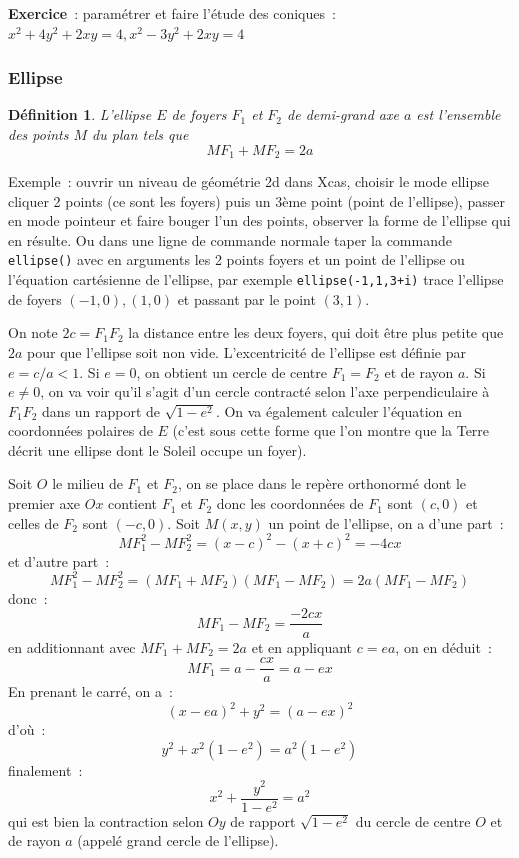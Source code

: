 \documentclass[a4paper,11pt]{article}
\newtheorem{defn}[thm]{D\'efinition}
\begin{document}
{\bf Exercice}~: param\'etrer et faire l'\'etude des coniques~:\\
$x^2+4y^2+2xy=4, x^2-3y^2+2xy=4$

\subsubsection{Ellipse}
\begin{defn}
L'ellipse $E$ de foyers $F_1$ et $F_2$ de demi-grand axe
$a$ est l'ensemble des points $M$ du plan tels que 
\[ MF_1+MF_2=2a\]
\end{defn}
Exemple~: ouvrir un niveau de g\'eom\'etrie 2d dans Xcas,
choisir le mode ellipse cliquer 2 points (ce sont les foyers)
puis un 3\`eme point (point de l'ellipse), passer en mode
pointeur et faire bouger l'un des points, observer la forme
de l'ellipse qui en r\'esulte. Ou dans une ligne de commande
normale taper la commande \verb|ellipse()| avec
en arguments les 2 points foyers et un point de l'ellipse
ou l'\'equation cart\'esienne de l'ellipse, par exemple
\verb|ellipse(-1,1,3+i)| trace l'ellipse de foyers $(-1,0), (1,0)$
et passant par le point $(3,1)$.

On note $2c=F_1F_2$ la distance entre les deux foyers, qui doit \^etre
plus petite que $2a$ pour que l'ellipse soit non vide.
L'excentricit\'e de l'ellipse est d\'efinie par $e=c/a < 1$. Si $e=0$,
on obtient un cercle de centre $F_1=F_2$ et de rayon $a$. Si $e\neq 0$,
on va voir qu'il s'agit d'un cercle contracté
selon l'axe perpendiculaire \`a $F_1F_2$ dans un rapport de 
$\sqrt{1-e^2}$. On va \'egalement calculer l'\'equation en
coordonn\'ees polaires de $E$ (c'est sous cette forme
que l'on montre que la Terre d\'ecrit une ellipse 
dont le Soleil occupe un foyer).

Soit $O$ le milieu de $F_1$ et $F_2$, on se place dans le rep\`ere 
orthonorm\'e
dont le premier axe $Ox$ contient $F_1$ et $F_2$ donc les
coordonn\'ees de $F_1$ sont $(c,0)$ et celles de $F_2$ sont $(-c,0)$. 
Soit $M(x,y)$ un
point de l'ellipse, on a d'une part~:
\[ MF_1^2 - MF_2^2 = (x-c)^2-(x+c)^2 = -4cx \]
et d'autre part~:
\[ MF_1^2 - MF_2^2 = (MF_1 + MF_2)(MF_1 - MF_2 ) = 2a (MF_1 - MF_2 )\]
donc~:
\[ MF_1 - MF_2 = \frac{-2cx}{a} \]
en additionnant avec $MF_1+MF_2=2a$ et en appliquant $c=ea$, on en d\'eduit~:
\begin{equation} \label{eq:MF1}
 MF_1 = a - \frac{cx}{a} = a-ex 
\end{equation}
En prenant le carr\'e, on a~:
\[ (x-ea)^2 + y^2 = (a-ex)^2\]
d'o\`u~:
\[ y^2 + x^2 (1-e^2) = a^2(1-e^2) \]
finalement~:
\[ x^2 + \frac{y^2}{1-e^2} = a^2 \]
qui est bien la contraction selon $Oy$ de rapport $\sqrt{1-e^2}$ du
cercle de centre $O$ et de rayon $a$ (appel\'e grand cercle de
l'ellipse).
\end{document}
